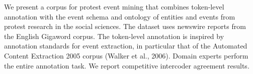 We present a corpus for protest event mining that combines token-level annotation with the event schema and ontology of entities and events from protest research in the social sciences. The dataset uses newswire reports from the English Gigaword corpus. The token-level annotation is inspired by annotation standards for event extraction, in particular that of the Automated Content Extraction 2005 corpus (Walker et al., 2006). Domain experts perform the entire annotation task. We report competitive intercoder agreement results.
